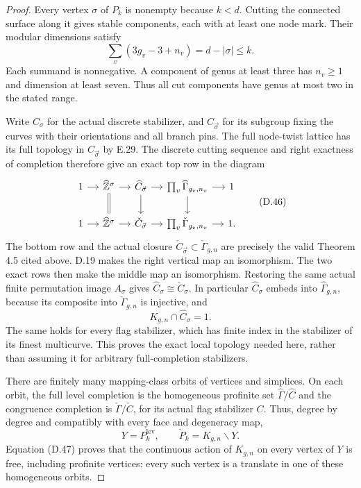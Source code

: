\begin{proof}
Every vertex $\sigma$ of $P_k$ is nonempty because
$k<d$.  Cutting the connected surface along it gives
stable components, each with at least one node mark.
Their modular dimensions satisfy
\[
       \sum_v(3g_v-3+n_v)=d-|\sigma|\leq k.                  \tag{D.45}
\]
Each summand is nonnegative.  A component of genus
at least three has $n_v\geq1$ and dimension at least
seven.  Thus all cut components have genus at most
two in the stated range.

Write $C_\sigma$ for the actual discrete stabilizer,
and $C_{\vec\sigma}$ for its subgroup fixing the
curves with their orientations and all branch pins.
The full node-twist lattice has its full topology
in $C_{\vec\sigma}$ by E.29.  The discrete cutting
sequence and right exactness of completion therefore
give an exact top row in the diagram
\[
\begin{tikzcd}[column sep=small]
1\arrow[r]&\widehat{\mathbb Z}^{\sigma}\arrow[r]\arrow[d,equal]
 &\widehat C_{\vec\sigma}\arrow[r]\arrow[d]
 &\prod_v\widehat\Gamma_{g_v,n_v}\arrow[r]\arrow[d]
 &1\\
1\arrow[r]&\widehat{\mathbb Z}^{\sigma}\arrow[r]
 &\check C_{\vec\sigma}\arrow[r]
 &\prod_v\check\Gamma_{g_v,n_v}\arrow[r]&1.
\end{tikzcd}                                                   \tag{D.46}
\]
The bottom row and the actual closure
$\check C_{\vec\sigma}\subset\check\Gamma_{g,n}$
are precisely the valid Theorem 4.5 cited above.
D.19 makes the right vertical map an isomorphism.
The two exact rows then make the middle map an
isomorphism.  Restoring the same actual finite
permutation image $A_\sigma$ gives
$\widehat C_\sigma\cong\check C_\sigma$.
In particular $\widehat C_\sigma$ embeds into
$\widehat\Gamma_{g,n}$, because its composite into
$\check\Gamma_{g,n}$ is injective, and
\[
               K_{g,n}\cap\widehat C_\sigma=1.               \tag{D.47}
\]
The same holds for every flag stabilizer, which has
finite index in the stabilizer of its finest
multicurve.  This proves the exact local topology
needed here, rather than assuming it for arbitrary
full-completion stabilizers.

There are finitely many mapping-class orbits of
vertices and simplices.  On each orbit, the full
level completion is the homogeneous profinite set
$\widehat\Gamma/\widehat C$ and the congruence
completion is $\check\Gamma/\check C$, for its
actual flag stabilizer $C$.  Thus, degree by degree
and compatibly with every face and degeneracy map,
\[
 Y=P_k^{\mathrm{lev}},\qquad
                    \check P_k=K_{g,n}\backslash Y.
\]
Equation (D.47) proves that the continuous action
of $K_{g,n}$ on every vertex of $Y$ is free,
including profinite vertices: every such vertex
is a translate in one of these homogeneous orbits.


\end{proof}
